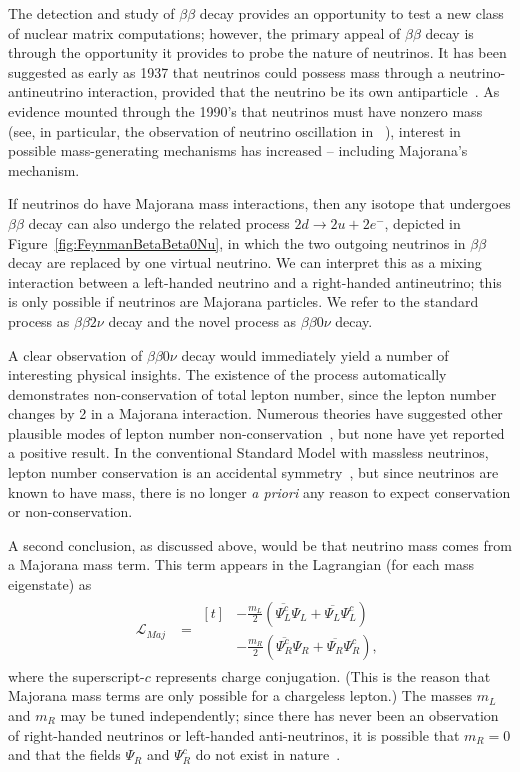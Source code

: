 The detection and study of $\beta\beta$ decay provides an opportunity to test a new class of nuclear matrix computations; however, the primary appeal of $\beta\beta$ decay is through the opportunity it provides to probe the nature of neutrinos.  It has been suggested as early as 1937 that neutrinos could possess mass through a neutrino-antineutrino interaction, provided that the neutrino be its own antiparticle~\cite{Majorana}.  As evidence mounted through the 1990's that neutrinos must have nonzero mass (see, in particular, the observation of neutrino oscillation in ~\cite{SuperK}), interest in possible mass-generating mechanisms has increased -- including Majorana's mechanism.

If neutrinos do have Majorana mass interactions, then any isotope that undergoes $\beta\beta$ decay can also undergo the related process $2d \rightarrow 2u + 2e^-$, depicted in Figure~\ref{fig:FeynmanBetaBeta0Nu}, in which the two outgoing neutrinos in $\beta\beta$ decay are replaced by one virtual neutrino.  We can interpret this as a mixing interaction between a left-handed neutrino and a right-handed antineutrino; this is only possible if neutrinos are Majorana particles.  We refer to the standard process as $\beta\beta 2\nu$ decay and the novel process as $\beta\beta 0\nu$ decay.

A clear observation of $\beta\beta 0\nu$ decay would immediately yield a number of interesting physical insights.  The existence of the process automatically demonstrates non-conservation of total lepton number, since the lepton number changes by 2 in a Majorana interaction.  Numerous theories have suggested other plausible modes of lepton number non-conservation~\cite{ProtonDecay}\cite{MuonToPositron}, but none have yet reported a positive result.  In the conventional Standard Model with massless neutrinos, lepton number conservation is an accidental symmetry~\cite{LeptonConservation}, but since neutrinos are known to have mass, there is no longer \textit{a priori} any reason to expect conservation or non-conservation.

A second conclusion, as discussed above, would be that neutrino mass comes from a Majorana mass term.  This term appears in the Lagrangian (for each mass eigenstate) as 
\begin{align}
\mathcal{L}_{Maj}&= \begin{aligned}[t]
 & -\frac{m_{L}}{2} \left( \overline{\Psi_L^c} \Psi_L^{} + \overline{\Psi_L^{}} \Psi_L^c \right)\\
 & -\frac{m_{R}}{2} \left( \overline{\Psi_R^c} \Psi_R^{} + \overline{\Psi_R^{}} \Psi_R^c \right),
\end{aligned}
\end{align}
where the superscript-$c$ represents charge conjugation.  (This is the reason that Majorana mass terms are only possible for a chargeless lepton.)  The masses $m_L$ and $m_R$ may be tuned independently; since there has never been an observation of right-handed neutrinos or left-handed anti-neutrinos, it is possible that $m_R = 0$ and that the fields $\Psi_R^{}$ and $\Psi_R^c$ do not exist in nature~\cite{PDG}.


